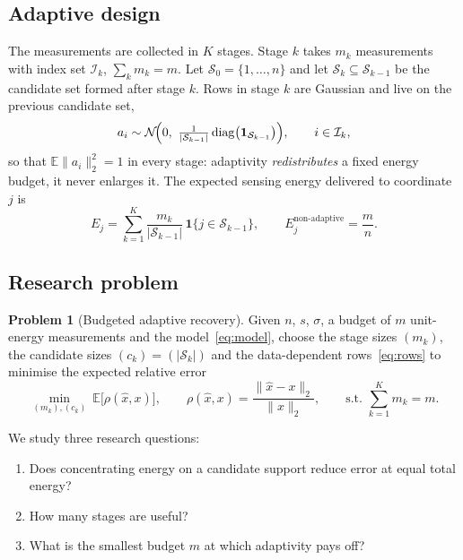 \documentclass[11pt,a4paper]{article}
\theoremstyle{definition}
\newtheorem{problem}{Problem}
\newcommand{\E}{\mathbb{E}}
\newcommand{\norm}[1]{\lVert #1\rVert}
\begin{document}
\subsection{Adaptive design}
The measurements are collected in $K$ stages. Stage $k$ takes $m_k$ measurements with index set $\mathcal I_k$, $\sum_k m_k=m$. Let $\mathcal S_0=\{1,\dots,n\}$ and let $\mathcal S_k\subseteq\mathcal S_{k-1}$ be the candidate set formed after stage $k$. Rows in stage $k$ are Gaussian and live on the previous candidate set,
\begin{equation}\label{eq:rows}
  a_i\sim\mathcal N\!\Bigl(0,\ \tfrac{1}{|\mathcal S_{k-1}|}\operatorname{diag}\bigl(\mathbf 1_{\mathcal S_{k-1}}\bigr)\Bigr),\qquad i\in\mathcal I_k,
\end{equation}
so that $\E\norm{a_i}_2^2=1$ in every stage: adaptivity \emph{redistributes} a fixed energy budget, it never enlarges it.
The expected sensing energy delivered to coordinate $j$ is
\begin{equation}\label{eq:energy}
  E_j=\sum_{k=1}^{K}\frac{m_k}{|\mathcal S_{k-1}|}\,\mathbf 1\{j\in\mathcal S_{k-1}\},
  \qquad E_j^{\text{non-adaptive}}=\frac{m}{n}.
\end{equation}

\subsection{Research problem}
\begin{problem}[Budgeted adaptive recovery]\label{prob:main}
Given $n$, $s$, $\sigma$, a budget of $m$ unit-energy measurements and the model~\eqref{eq:model}, choose the stage sizes $(m_k)$, the candidate sizes $(c_k)=(|\mathcal S_k|)$ and the data-dependent rows~\eqref{eq:rows} to minimise the expected relative error
\begin{equation}\label{eq:objective}
  \min_{(m_k),(c_k)}\ \E\bigl[\rho(\hat x,x)\bigr],\qquad
  \rho(\hat x,x)=\frac{\norm{\hat x-x}_2}{\norm{x}_2},\qquad \text{s.t. } \sum_{k=1}^{K}m_k=m .
\end{equation}
\end{problem}
We study three research questions:
\begin{enumerate}[label=\textbf{RQ\arabic*.}]
  \item Does concentrating energy on a candidate support reduce error at equal total energy?
  \item How many stages are useful?
  \item What is the smallest budget $m$ at which adaptivity pays off?
\end{enumerate}
\end{document}
